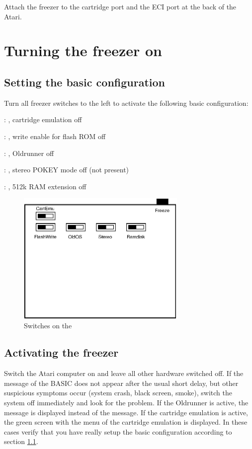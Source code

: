 Attach the freezer to the cartridge port and the ECI port at the back of
the Atari.


\section{Turning the freezer on}

\subsection{Setting the basic configuration}
\label{sec:baseconfig}

Turn all freezer switches to the left to activate the following basic
configuration:
\begin{itemize*}
\item {}: , cartridge emulation off
\item {}: , write enable for flash ROM off
\item {}: , Oldrunner off
\item {}: , stereo POKEY mode off (not present)
\item {}: , 512k RAM extension off
\end{itemize*}

\begin{figure}[h]
  \centering
  \includegraphics[width=22em]{freezer2011.eps}
  \caption{Switches on the \frz}
\end{figure}

\subsection{Activating the freezer}

Switch the Atari computer on and leave all other hardware switched off. If the
 message of the BASIC does not appear after the usual short delay,
but other suspicious symptoms occur (system crash, black screen, smoke), switch
the system off immediately and look for the problem. If the Oldrunner is active,
the message  is displayed instead of the 
message. If the cartridge emulation is active, the green screen with the
 menu of the cartridge emulation is displayed. In these
cases verify that you have really setup the basic configuration according to
section \ref{sec:baseconfig}.

